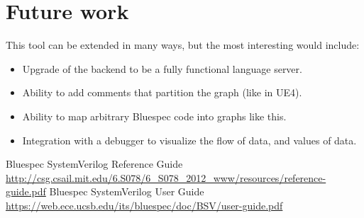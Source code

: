 \documentclass[12pt]{report}
\begin{document}
\section{Future work} 
This tool can be extended in many ways, but the most interesting would include: 
\begin{itemize} 
   \item Upgrade of the backend to be a fully functional language server. 
   \item Ability to add comments that partition the graph (like in UE4).
   \item Ability to map arbitrary Bluespec code into graphs like this. 
   \item Integration with a debugger to visualize the flow of data, and values of data. 
\end{itemize} 
\begin{thebibliography}{9}
   Bluespec SystemVerilog Reference Guide
   \href{http://csg.csail.mit.edu/6.S078/6\_S078\_2012\_www/resources/reference-guide.pdf}{http://csg.csail.mit.edu/6.S078/6\_S078\_2012\_www/resources/reference-guide.pdf}
   Bluespec SystemVerilog User Guide
   \href{https://web.ece.ucsb.edu/its/bluespec/doc/BSV/user-guide.pdf}{https://web.ece.ucsb.edu/its/bluespec/doc/BSV/user-guide.pdf}
   
   \end{thebibliography}

\end{document}
